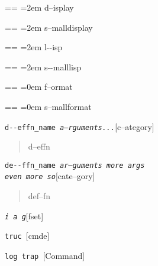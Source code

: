 \documentclass{book}
\makeatletter
\newcommand\GNUTexinfocommandstyletextvar[1]{{\normalfont{}\textsl{#1}}}%
\newenvironment{GNUTexinfopreformatted}{%
  \par\obeylines\obeyspaces\frenchspacing
  \parskip=\z@\parindent=\z@}{}
\makeatother
\begin{document}
\begin{GNUTexinfopreformatted}
\leftskip=2em\relax%
d--isplay
\end{GNUTexinfopreformatted}

\begin{GNUTexinfopreformatted}
\leftskip=2em\relax\footnotesize%
s--malldisplay
\end{GNUTexinfopreformatted}

\begin{GNUTexinfopreformatted}
\leftskip=2em\relax\ttfamily%
l{-}{-}isp
\end{GNUTexinfopreformatted}

\begin{GNUTexinfopreformatted}
\leftskip=2em\relax\ttfamily\footnotesize%
s{-}{-}malllisp
\end{GNUTexinfopreformatted}

\begin{GNUTexinfopreformatted}
\leftskip=0em\relax%
f--ormat
\end{GNUTexinfopreformatted}

\begin{GNUTexinfopreformatted}
\leftskip=0em\relax\footnotesize%
s--mallformat
\end{GNUTexinfopreformatted}

\noindent\texttt{d{-}{-}effn\_name \EmbracOn{}\textnormal{\textsl{a--rguments...}}\EmbracOff{}}\hfill[c--ategory]

%
\begin{quote}
\unskip{\parskip=0pt\noindent}%
d--effn
\end{quote}

\noindent\texttt{de{-}{-}ffn\_name \EmbracOn{}\textnormal{\textsl{ar--guments    more args \leavevmode{}\\ even more so}}\EmbracOff{}}\hfill[cate--gory]

%
\begin{quote}
\unskip{\parskip=0pt\noindent}%
def--fn
\end{quote}

\noindent\texttt{\GNUTexinfocommandstyletextvar{i} \EmbracOn{}\textnormal{\textsl{a g}}\EmbracOff{}}\hfill[fset]

\index[fn]{i@\texttt{\GNUTexinfocommandstyletextvar{i}}}%
%
\noindent\texttt{truc \EmbracOn{}\textnormal{\textsl{}}\EmbracOff{}}\hfill[cmde]

%
\noindent\texttt{log trap \EmbracOn{}\textnormal{\textsl{}}\EmbracOff{}}\hfill[Command]
\end{document}
